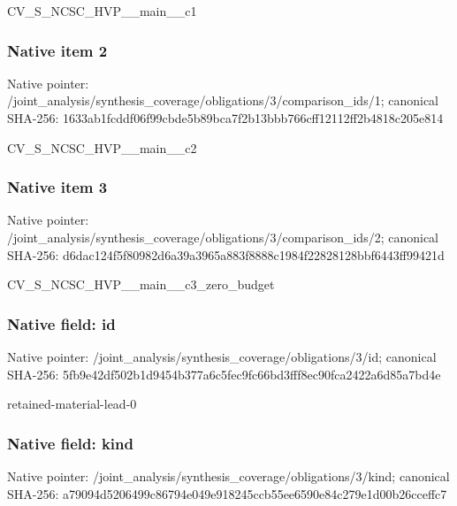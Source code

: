 \documentclass[10pt,a4paper]{article}
\begin{document}
\begingroup\raggedright\sloppy CV\_\allowbreak{}S\_\allowbreak{}NCSC\_\allowbreak{}HVP\_\allowbreak{}\_\allowbreak{}main\_\allowbreak{}\_\allowbreak{}c1\par\endgroup

\subsubsection{Native item 2}
Native pointer: /joint\_\allowbreak{}analysis/synthesis\_\allowbreak{}coverage/obligations/3/comparison\_\allowbreak{}ids/1; canonical SHA-256: 1633ab1fcddf06f99cbde5b89bca7f2b13bbb766cff12112ff2b4818c205e814

\begingroup\raggedright\sloppy CV\_\allowbreak{}S\_\allowbreak{}NCSC\_\allowbreak{}HVP\_\allowbreak{}\_\allowbreak{}main\_\allowbreak{}\_\allowbreak{}c2\par\endgroup

\subsubsection{Native item 3}
Native pointer: /joint\_\allowbreak{}analysis/synthesis\_\allowbreak{}coverage/obligations/3/comparison\_\allowbreak{}ids/2; canonical SHA-256: d6dac124f5f80982d6a39a3965a883f8888c1984f22828128bbf6443ff99421d

\begingroup\raggedright\sloppy CV\_\allowbreak{}S\_\allowbreak{}NCSC\_\allowbreak{}HVP\_\allowbreak{}\_\allowbreak{}main\_\allowbreak{}\_\allowbreak{}c3\_\allowbreak{}zero\_\allowbreak{}budget\par\endgroup

\subsubsection{Native field: id}
Native pointer: /joint\_\allowbreak{}analysis/synthesis\_\allowbreak{}coverage/obligations/3/id; canonical SHA-256: 5fb9e42df502b1d9454b377a6c5fec9fc66bd3fff8ec90fca2422a6d85a7bd4e

\begingroup\raggedright\sloppy retained-material-lead-0\par\endgroup

\subsubsection{Native field: kind}
Native pointer: /joint\_\allowbreak{}analysis/synthesis\_\allowbreak{}coverage/obligations/3/kind; canonical SHA-256: a79094d5206499c86794e049e918245ccb55ee6590e84c279e1d00b26cceffc7
\end{document}
